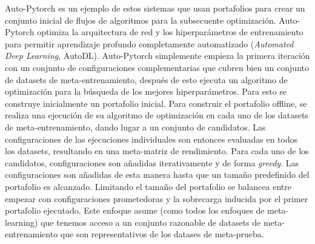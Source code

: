 \documentclass[a4paper,12pt]{article}
\begin{document}
Auto-Pytorch \cite{zimmer2021auto} es un ejemplo de estos sistemas que usan portafolios para crear un conjunto inicial de flujos de algoritmos para la subsecuente optimización. Auto-Pytorch optimiza la arquitectura de red y los hiperparámetros de entrenamiento para permitir aprendizaje profundo completamente automatizado (\textit{Automated Deep Learning}, AutoDL). 
 Auto-Pytorch simplemente empieza la primera iteración con un conjunto de configuraciones complementarias que cubren bien un conjunto de datasets de meta-entrenamiento, después de esto ejecuta un algoritmo de optimización para la búsqueda de los mejores hiperparámetros. Para esto se construye inicialmente un portafolio inicial. Para construir el portafolio offline, se realiza una ejecución de su algoritmo de optimización en cada uno de los datasets de meta-entrenamiento, dando lugar a un conjunto de candidatos. Las configuraciones de las ejecuciones individuales son entonces evaluadas en todos los datasets, resultando en una meta-matriz de rendimiento. Para cada uno de los candidatos, configuraciones son añadidas iterativamente y de forma \textit{greedy}.
 Las configuraciones son añadidas de esta manera hasta que un tamaño predefinido del portafolio es alcanzado. Limitando el tamaño del portafolio se balancea entre empezar con configuraciones prometedoras y la sobrecarga inducida por el primer portafolio ejecutado. Este enfoque asume (como todos los enfoques de meta-learning) que tenemos acceso a un conjunto razonable de datasets de meta-entrenamiento que son representativos de los datases de meta-prueba.
\end{document}
